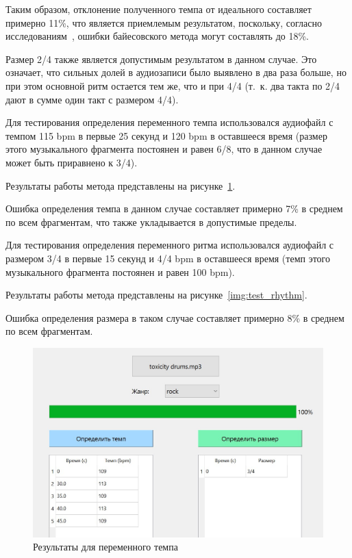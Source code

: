 Таким образом, отклонение полученного темпа от идеального составляет примерно 11\%, что является приемлемым результатом, поскольку, согласно исследованиям~\cite{bayesian}, ошибки байесовского метода могут составлять до 18\%.

Размер 2/4 также является допустимым результатом в данном случае. Это означает, что сильных долей в аудиозаписи было выявлено в два раза больше, но при этом основной ритм остается тем же, что и при 4/4 (т.~к. два такта по 2/4 дают в сумме один такт с размером 4/4).

Для тестирования определения переменного темпа использовался аудиофайл с темпом 115 bpm в первые 25 секунд и 120 bpm в оставшееся время (размер этого музыкального фрагмента постоянен и равен 6/8, что в данном случае может быть приравнено к 3/4).

Результаты работы метода представлены на рисунке~\ref{img:test_tempo}.

Ошибка определения темпа в данном случае составляет примерно 7\% в среднем по всем фрагментам, что также укладывается в допустимые пределы.

Для тестирования определения переменного ритма использовался аудиофайл с размером 3/4 в первые 15 секунд и 4/4 bpm в оставшееся время (темп этого музыкального фрагмента постоянен и равен 100 bpm).

Результаты работы метода представлены на рисунке~\ref{img:test_rhythm}.

Ошибка определения размера в таком случае составляет примерно 8\% в среднем по всем фрагментам.

\begin{figure}[h]
	\centering
	\includegraphics[scale=0.85]{inc/img/test_tempo.jpg}
	\caption{Результаты для переменного темпа}
	\label{img:test_tempo}
\end{figure}

